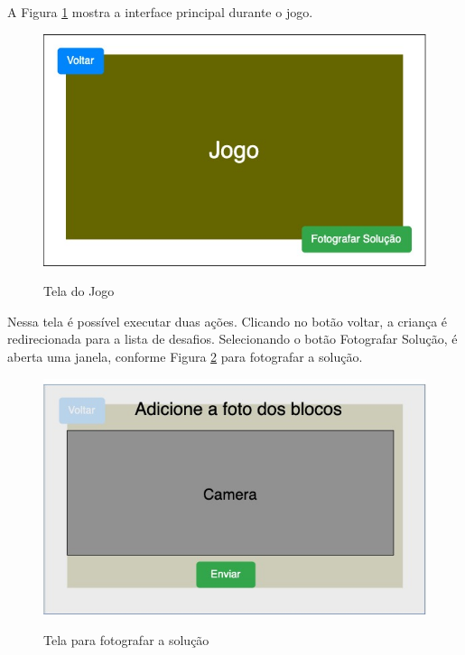     A Figura \ref{figura:tela_jogo} mostra a interface principal durante o jogo.
    
    \begin{figure}[H]
        \caption{Tela do Jogo}
        \centering
        \includegraphics[width=\linewidth]{Imagens/Cap3/tela_jogo.jpg}
        \label{figura:tela_jogo}
    \end{figure}
    
    Nessa tela é possível executar duas ações. Clicando no botão voltar, a criança é redirecionada para a lista de desafios. Selecionando o botão Fotografar Solução, é aberta uma janela, conforme Figura \ref{figura:fotografar_blocos} para fotografar a solução.
    
    \begin{figure}[H]
        \caption{Tela para fotografar a solução}
        \centering
        \includegraphics[width=\linewidth]{Imagens/Cap3/UploadSolucao.jpg}
        \label{figura:fotografar_blocos}
    \end{figure}
    

